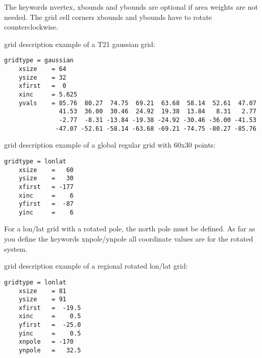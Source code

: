 \vspace{3mm}

The keywords nvertex, xbounds and ybounds are optional if area weights are not needed.
The grid cell corners xbounds and ybounds have to rotate counterclockwise.

\vspace{2mm}

{\CDO} grid description example of a T21 gaussian grid:
\begin{lstlisting}[frame=single, backgroundcolor=\color{pcolor1}, basicstyle=\footnotesize]
    gridtype = gaussian
    xsize    = 64
    ysize    = 32
    xfirst   =  0
    xinc     = 5.625
    yvals    = 85.76  80.27  74.75  69.21  63.68  58.14  52.61  47.07
               41.53  36.00  30.46  24.92  19.38  13.84   8.31   2.77
               -2.77  -8.31 -13.84 -19.38 -24.92 -30.46 -36.00 -41.53
              -47.07 -52.61 -58.14 -63.68 -69.21 -74.75 -80.27 -85.76
\end{lstlisting}

\vspace{2mm}

{\CDO} grid description example of a global regular grid with 60x30 points:
\begin{lstlisting}[frame=single, backgroundcolor=\color{pcolor1}, basicstyle=\footnotesize]
    gridtype = lonlat
    xsize    =   60
    ysize    =   30
    xfirst   = -177
    xinc     =    6
    yfirst   =  -87
    yinc     =    6
\end{lstlisting}

\vspace{2mm}

For a lon/lat grid with a rotated pole, the north pole must be defined.
As far as you define the keywords xnpole/ynpole all coordinate values
are for the rotated system.

\vspace{2mm}

{\CDO} grid description example of a regional rotated lon/lat grid:
\begin{lstlisting}[frame=single, backgroundcolor=\color{pcolor1}, basicstyle=\footnotesize]
    gridtype = lonlat
    xsize    = 81
    ysize    = 91
    xfirst   =  -19.5
    xinc     =    0.5
    yfirst   =  -25.0
    yinc     =    0.5
    xnpole   = -170
    ynpole   =   32.5
\end{lstlisting}

